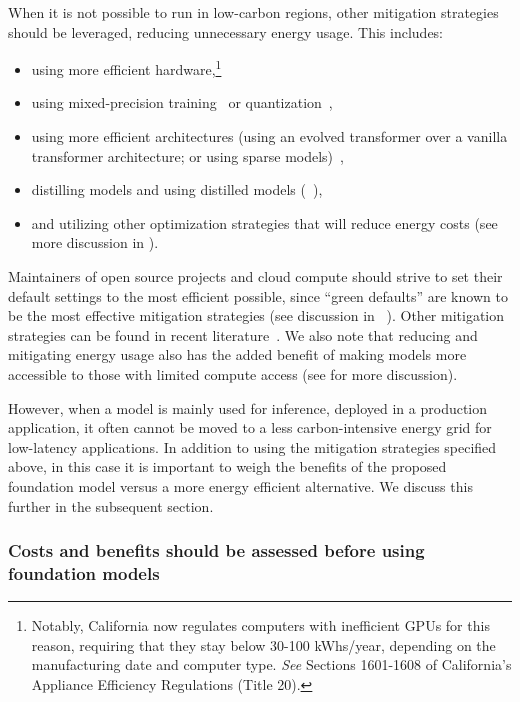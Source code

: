 When it is not possible to run in low-carbon regions, other mitigation strategies should be leveraged, reducing unnecessary energy usage. This includes:
\begin{itemize}
    \item using more efficient hardware,\footnote{Notably, California now regulates computers with inefficient GPUs for this reason, requiring that they stay below 30-100 kWhs/year, depending on the manufacturing date and computer type. \emph{See} Sections 1601-1608 of California’s Appliance Efficiency 
Regulations (Title 20).}
\item using mixed-precision training~\citep{micikevicius2017mixed} or quantization~\citep{gholami2021survey},
\item using more efficient architectures (\eg using an evolved transformer over a vanilla transformer architecture; or using sparse models)~\citep{pmlr-v97-so19a,patterson2021carbon,mostafa_parameter_2019},
\item distilling models and using distilled models (\eg~\citep{sanh2019distilbert}),
\item and utilizing other optimization strategies that will reduce energy costs (see more discussion in ).
\end{itemize}

Maintainers of open source projects and cloud compute should strive to set their default settings to the most efficient possible, since ``green defaults'' are known to be the most effective mitigation strategies (see discussion in ~\citep{henderson2020towards}).
Other mitigation strategies can be found in recent literature~\citep{strubell2019energy,lacoste2019quantifying,schwartz2019green,henderson2020towards}.
We also note that reducing and mitigating energy usage also has the added benefit of making models more accessible to those with limited compute access (see  for more discussion).

However, when a model is mainly used for inference, \eg  deployed in a production application, it often cannot be moved to a less carbon-intensive energy grid for low-latency applications. 
In addition to using the mitigation strategies specified above, in this case it is important to weigh
the benefits of the proposed foundation model versus a more energy efficient alternative. We discuss this further in the subsequent section.

\subsubsection{Costs and benefits should be assessed before using foundation models}
\label{sec:environment-costs}

